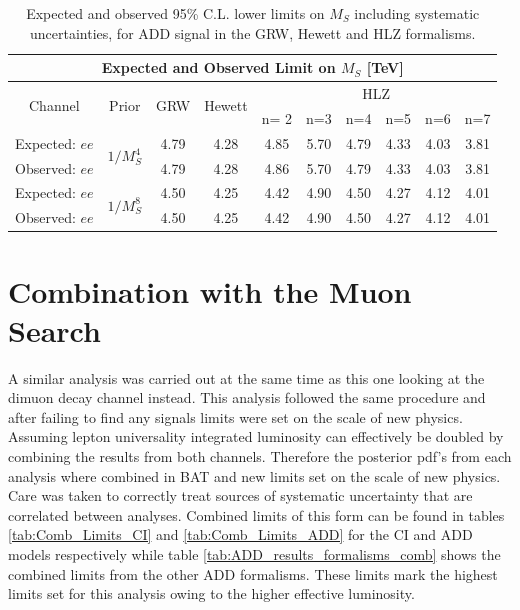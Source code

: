 \begin{table}[]
  \begin{center}
    \begin{tabular}{c|c|c|c|cccccc}
        \hline
        \hline
        \multicolumn{10}{c}{Expected and Observed Limit on $M_{S}$ [TeV]} \\
        \hline
        \multirow{2}{*}{Channel} & \multirow{2}{*}{Prior} & \multirow{2}{*}{GRW} & \multirow{2}{*}{Hewett} & \multicolumn{6}{c}{HLZ} \\
        \cline{5-10}
                &       &     &        & n= 2 &  n=3 & n=4 & n=5 & n=6 & n=7 \\
        \hline
        \hline
        Expected: $ee$      & \multirow{2}{*}{$1/M_{S}^{4}$} & 4.79 & 4.28 & 4.85 & 5.70 & 4.79 & 4.33 & 4.03 & 3.81 \\
        Observed: $ee$      &  & 4.79 & 4.28 & 4.86 & 5.70 & 4.79 & 4.33 & 4.03 & 3.81 \\
        \hline
        Expected: $ee$      & \multirow{2}{*}{$1/M_{S}^{8}$} & 4.50 & 4.25 & 4.42 & 4.90 & 4.50 & 4.27 & 4.12 & 4.01 \\
        Observed: $ee$      &  & 4.50 & 4.25 & 4.42 & 4.90 & 4.50 & 4.27 & 4.12 & 4.01 \\
        \hline
        \hline
    \end{tabular}
  \end{center}
    \caption{Expected and observed 95\% C.L. lower limits on $M_{S}$ including systematic uncertainties, for ADD signal in the GRW, Hewett and HLZ formalisms.
    \label{tab:ADD_results_formalisms}}
\end{table}



\section{Combination with the Muon Search}

    A similar analysis was carried out at the same time as this one looking at the dimuon decay channel instead. This analysis followed the same procedure and after failing to find any signals limits were set on the scale of new physics. Assuming lepton universality integrated luminosity can effectively be doubled by combining the results from both channels. Therefore the posterior pdf's from each analysis where combined in BAT and new limits set on the scale of new physics. Care was taken to correctly treat sources of systematic uncertainty that are correlated between analyses. Combined limits of this form can be found in tables \ref{tab:Comb_Limits_CI} and \ref{tab:Comb_Limits_ADD} for the CI and ADD models respectively while table \ref{tab:ADD_results_formalisms_comb} shows the combined limits from the other ADD formalisms. These limits mark the highest limits set for this analysis owing to the higher effective luminosity. 


